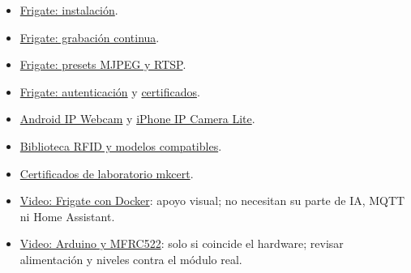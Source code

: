 \documentclass[12pt,a4paper]{article}
\begin{document}
\begin{itemize}
\item \href{https://docs.frigate.video/frigate/installation/}{Frigate: instalación}.
\item \href{https://docs.frigate.video/configuration/record/}{Frigate: grabación continua}.
\item \href{https://docs.frigate.video/configuration/ffmpeg_presets/}{Frigate: presets MJPEG y RTSP}.
\item \href{https://docs.frigate.video/configuration/authentication/}{Frigate: autenticación} y \href{https://docs.frigate.video/configuration/tls/}{certificados}.
\item \href{https://play.google.com/store/apps/details?id=com.pas.webcam}{Android IP Webcam} y \href{https://apps.apple.com/us/app/ip-camera-lite/id1013455241}{iPhone IP Camera Lite}.
\item \href{https://github.com/miguelbalboa/rfid}{Biblioteca RFID y modelos compatibles}.
\item \href{https://github.com/FiloSottile/mkcert}{Certificados de laboratorio mkcert}.
\item \href{https://www.youtube.com/watch?v=KMD72_Wfp3E}{Video: Frigate con Docker}: apoyo visual; no necesitan su parte de IA, MQTT ni Home Assistant.
\item \href{https://www.youtube.com/watch?v=CQLPo7xqORQ}{Video: Arduino y MFRC522}: solo si coincide el hardware; revisar alimentación y niveles contra el módulo real.
\end{itemize}
\end{document}
